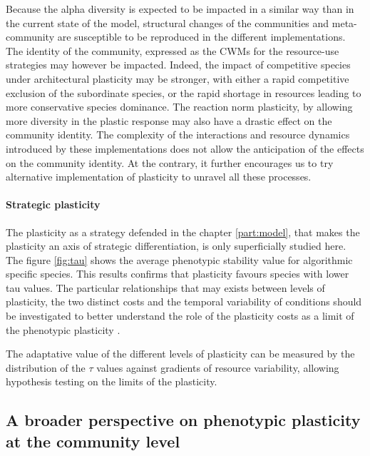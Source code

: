 Because the alpha diversity is expected to be impacted in a similar way than in the current state of the model, structural changes of the communities and meta-community are susceptible to be reproduced in the different implementations. The identity of the community, expressed as the CWMs for the resource-use strategies may however be impacted. Indeed, the impact of competitive species under architectural plasticity may be stronger, with either a rapid competitive exclusion of the subordinate species, or the rapid shortage in resources leading to more conservative species dominance. The reaction norm plasticity, by allowing more diversity in the plastic response may also have a drastic effect on the community identity. The complexity of the interactions and resource dynamics introduced by these implementations does not allow the anticipation of the effects on the community identity. At the contrary, it further encourages us to try alternative implementation of plasticity to unravel all these processes.



\paragraph{Strategic plasticity}

The plasticity as a strategy defended in the chapter \ref{part:model}, that makes the plasticity an axis of strategic differentiation, is only superficially studied here. The figure \ref{fig:tau} shows the average phenotypic stability value for algorithmic specific species. This results confirms that plasticity favours species with lower tau values. The particular relationships that may exists between levels of plasticity, the two distinct costs and the temporal variability of conditions should be investigated to better understand the role of the plasticity costs as a limit of the phenotypic plasticity \parencite{dewitt_costs_1998, auld_re-evaluating_2009}.

The adaptative value of the different levels of plasticity can be measured by the distribution of the $\tau$ values against gradients of resource variability, allowing hypothesis testing on the limits of the plasticity.

\subsection{A broader perspective on phenotypic plasticity at the community level}

